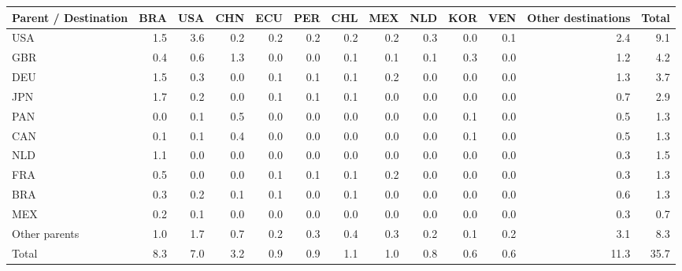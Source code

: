 \begin{tabular}{lrrrrrrrrrrrr}
\toprule
Parent / Destination & BRA & USA & CHN & ECU & PER & CHL & MEX & NLD & KOR & VEN & Other destinations & Total \\
\midrule
USA & 1.5 & 3.6 & 0.2 & 0.2 & 0.2 & 0.2 & 0.2 & 0.3 & 0.0 & 0.1 & 2.4 & 9.1 \\
GBR & 0.4 & 0.6 & 1.3 & 0.0 & 0.0 & 0.1 & 0.1 & 0.1 & 0.3 & 0.0 & 1.2 & 4.2 \\
DEU & 1.5 & 0.3 & 0.0 & 0.1 & 0.1 & 0.1 & 0.2 & 0.0 & 0.0 & 0.0 & 1.3 & 3.7 \\
JPN & 1.7 & 0.2 & 0.0 & 0.1 & 0.1 & 0.1 & 0.0 & 0.0 & 0.0 & 0.0 & 0.7 & 2.9 \\
PAN & 0.0 & 0.1 & 0.5 & 0.0 & 0.0 & 0.0 & 0.0 & 0.0 & 0.1 & 0.0 & 0.5 & 1.3 \\
CAN & 0.1 & 0.1 & 0.4 & 0.0 & 0.0 & 0.0 & 0.0 & 0.0 & 0.1 & 0.0 & 0.5 & 1.3 \\
NLD & 1.1 & 0.0 & 0.0 & 0.0 & 0.0 & 0.0 & 0.0 & 0.0 & 0.0 & 0.0 & 0.3 & 1.5 \\
FRA & 0.5 & 0.0 & 0.0 & 0.1 & 0.1 & 0.1 & 0.2 & 0.0 & 0.0 & 0.0 & 0.3 & 1.3 \\
BRA & 0.3 & 0.2 & 0.1 & 0.1 & 0.0 & 0.1 & 0.0 & 0.0 & 0.0 & 0.0 & 0.6 & 1.3 \\
MEX & 0.2 & 0.1 & 0.0 & 0.0 & 0.0 & 0.0 & 0.0 & 0.0 & 0.0 & 0.0 & 0.3 & 0.7 \\
Other parents & 1.0 & 1.7 & 0.7 & 0.2 & 0.3 & 0.4 & 0.3 & 0.2 & 0.1 & 0.2 & 3.1 & 8.3 \\
\midrule
Total & 8.3 & 7.0 & 3.2 & 0.9 & 0.9 & 1.1 & 1.0 & 0.8 & 0.6 & 0.6 & 11.3 & 35.7 \\
\bottomrule
\end{tabular}
